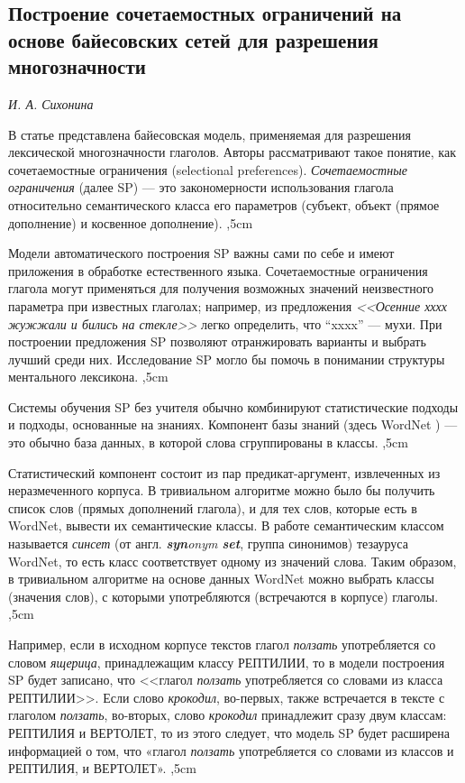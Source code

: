 \documentclass{article}
\begin{document}
\begin{articletext}
\section{Построение сочетаемостных ограничений на основе байесовских сетей для разрешения многозначности}
\begin{flushright}
\textit{И. А. Сихонина} 
\end{flushright}

В статье \cite{Ciaramita 2000} представлена байесовская модель, применяемая для разрешения лексической многозначности глаголов. Авторы рассматривают такое понятие, как сочетаемостные ограничения (selectional preferences). \textit{Сочетаемостные ограничения} (далее SP) --- это закономерности использования глагола относительно семантического класса его параметров (субъект, объект (прямое дополнение) и косвенное дополнение).
,5cm

Модели автоматического построения SP важны сами по себе и имеют приложения в обработке естественного языка. Сочетаемостные ограничения глагола могут применяться для получения возможных значений неизвестного параметра при известных глаголах; например, из предложения \textit{<<Осенние хххх жужжали и бились на стекле>>} легко определить, что “xxxx” --- мухи. При построении предложения SP позволяют отранжировать варианты и выбрать лучший среди них. Исследование SP могло бы помочь в понимании структуры ментального лексикона. 
,5cm

Системы обучения SP без учителя обычно комбинируют статистические подходы и подходы, основанные на знаниях. Компонент базы знаний (здесь WordNet \cite{Miller 1990}) --- это обычно база данных, в которой слова сгруппированы в классы. 
,5cm

Статистический компонент состоит из пар предикат-аргумент, извлеченных из неразмеченного корпуса. В тривиальном алгоритме можно было бы получить список слов (прямых дополнений глагола), и для тех слов, которые есть в WordNet, вывести их семантические классы. В работе \cite{Ciaramita 2000} семантическим классом называется \textit{синсет} (от англ. \textit{\textbf{syn}onym \textbf{set}}, группа синонимов) тезауруса WordNet, то есть класс соответствует одному из значений слова. Таким образом, в тривиальном алгоритме на основе данных WordNet можно выбрать классы (значения слов), с которыми употребляются (встречаются в корпусе) глаголы.
,5cm

Например, если в исходном корпусе текстов глагол \textit{ползать} употребляется со словом \textit{ящерица}, принадлежащим классу РЕПТИЛИИ, то в модели построения SP будет записано, что <<глагол \textit{ползать} употребляется со словами из класса РЕПТИЛИИ>>. Если слово \textit{крокодил}, во-первых, также встречается в тексте с глаголом \textit{ползать}, во-вторых, слово \textit{крокодил} принадлежит сразу двум классам: РЕПТИЛИЯ и ВЕРТОЛЕТ, то из этого следует, что модель SP будет расширена информацией о том, что «глагол \textit{ползать} употребляется со словами из классов и РЕПТИЛИЯ, и ВЕРТОЛЕТ».
,5cm


\end{articletext}
\end{document}
